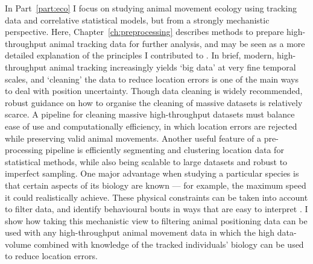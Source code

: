 In Part~\ref{part:eco} I focus on studying animal movement ecology using tracking data and correlative statistical models, but from a strongly mechanistic perspective.
Here, Chapter~\ref{ch:preprocessing} describes methods to prepare high-throughput animal tracking data for further analysis, and may be seen as a more detailed explanation of the principles I contributed to \parencite{nathan2022}.
In brief, modern, high-throughput animal tracking increasingly yields `big data' at very fine temporal scales, and `cleaning' the data to reduce location errors is one of the main ways to deal with position uncertainty.
Though data cleaning is widely recommended, robust guidance on how to organise the cleaning of massive datasets is relatively scarce.
A pipeline for cleaning massive high-throughput datasets must balance ease of use and computationally efficiency, in which location errors are rejected while preserving valid animal movements. 
Another useful feature of a pre-processing pipeline is efficiently segmenting and clustering location data for statistical methods, while also being scalable to large datasets and robust to imperfect sampling.
One major advantage when studying a particular species is that certain aspects of its biology are known --- for example, the maximum speed it could realistically achieve.
These physical constraints can be taken into account to filter data, and identify behavioural bouts in ways that are easy to interpret \parencite[][]{barraquand2008}.
I show how taking this mechanistic view to filtering animal positioning data can be used with any high-throughput animal movement data in which the high data-volume combined with knowledge of the tracked individuals' biology can be used to reduce location errors.

